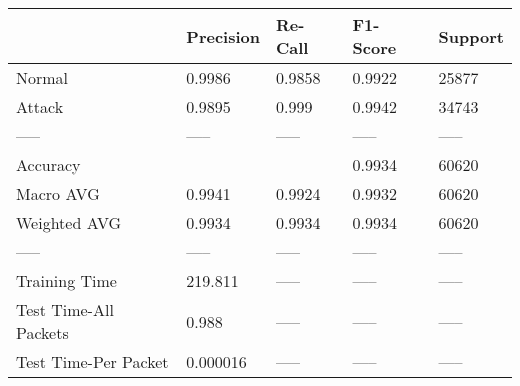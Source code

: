 \begin{tabular}{lllll}
\toprule
{} & Precision & Re-Call & F1-Score & Support \\
\midrule
Normal                &    0.9986 &  0.9858 &   0.9922 &   25877 \\
Attack                &    0.9895 &   0.999 &   0.9942 &   34743 \\
-----                 &     ----- &   ----- &    ----- &   ----- \\
Accuracy              &           &         &   0.9934 &   60620 \\
Macro AVG             &    0.9941 &  0.9924 &   0.9932 &   60620 \\
Weighted AVG          &    0.9934 &  0.9934 &   0.9934 &   60620 \\
-----                 &     ----- &   ----- &    ----- &   ----- \\
Training Time         &   219.811 &   ----- &    ----- &   ----- \\
Test Time-All Packets &     0.988 &   ----- &    ----- &   ----- \\
Test Time-Per Packet  &  0.000016 &   ----- &    ----- &   ----- \\
\bottomrule
\end{tabular}
